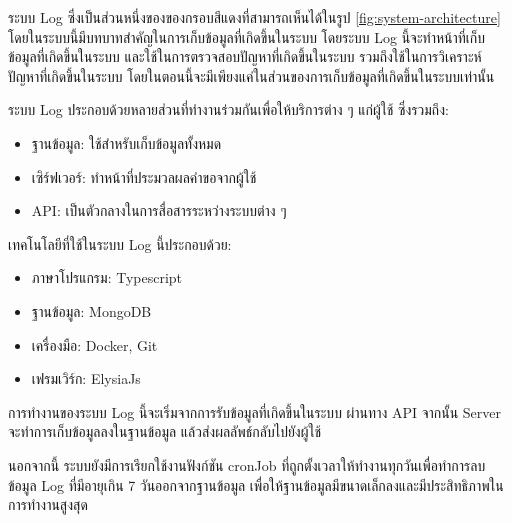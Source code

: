 \ifenglish
\else
ระบบ Log ซึ่งเป็นส่วนหนึ่งของของกรอบสีแดงที่สามารถเห็นได้ในรูป \ref{fig:system-architecture} โดยในระบบนี้มีบทบาทสำคัญในการเก็บข้อมูลที่เกิดขึ้นในระบบ โดยระบบ Log นี้จะทำหน้าที่เก็บข้อมูลที่เกิดขึ้นในระบบ และใช้ในการตรวจสอบปัญหาที่เกิดขึ้นในระบบ รวมถึงใช้ในการวิเคราะห์ปัญหาที่เกิดขึ้นในระบบ โดยในตอนนี้จะมีเพียงแค่ในส่วนของการเก็บข้อมูลที่เกิดขึ้นในระบบเท่านั้น

ระบบ Log ประกอบด้วยหลายส่วนที่ทำงานร่วมกันเพื่อให้บริการต่าง ๆ แก่ผู้ใช้ ซึ่งรวมถึง:
\begin{itemize}
    \item ฐานข้อมูล: ใช้สำหรับเก็บข้อมูลทั้งหมด
    \item เซิร์ฟเวอร์: ทำหน้าที่ประมวลผลคำขอจากผู้ใช้
    \item API: เป็นตัวกลางในการสื่อสารระหว่างระบบต่าง ๆ
\end{itemize}

เทคโนโลยีที่ใช้ในระบบ Log นี้ประกอบด้วย:
\begin{itemize}
    \item ภาษาโปรแกรม: Typescript
    \item ฐานข้อมูล: MongoDB
    \item เครื่องมือ: Docker, Git
    \item เฟรมเวิร์ก: ElysiaJs
\end{itemize}

การทำงานของระบบ Log นี้จะเริ่มจากการรับข้อมูลที่เกิดขึ้นในระบบ ผ่านทาง API จากนั้น Server จะทำการเก็บข้อมูลลงในฐานข้อมูล แล้วส่งผลลัพธ์กลับไปยังผู้ใช้

นอกจากนี้ ระบบยังมีการเรียกใช้งานฟังก์ชัน cronJob ที่ถูกตั้งเวลาให้ทำงานทุกวันเพื่อทำการลบข้อมูล Log ที่มีอายุเกิน 7 วันออกจากฐานข้อมูล เพื่อให้ฐานข้อมูลมีขนาดเล็กลงและมีประสิทธิภาพในการทำงานสูงสุด
\fi